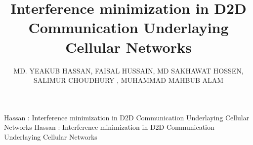 \documentclass{ieeeaccess}
\begin{document}

\title{Interference minimization in D2D Communication Underlaying Cellular Networks}
\author{\uppercase{Md. Yeakub Hassan},
	\uppercase{Faisal Hussain, Md Sakhawat Hossen, Salimur Choudhury , Muhammad Mahbub Alam}}
\address[1]{Department of Computer Science and Engineering, Islamic University of Technology, Dhaka, Bangladesh (e-mail: yeakubhassan@iut-dhaka.edu, faisalhussain@iut-dhaka.edu, sakhawat@iut-dhaka.edu, mma@iut-dhaka.edu)}
\address[2]{Department of Computer Science, Lakehead University, Thunder Bay, Ontario, Canada (e-mail: salimur.choudhury@lakeheadu.ca)}



%
%


\markboth
{Hassan \headeretal: Interference minimization in D2D Communication Underlaying Cellular Networks}
{Hassan \headeretal: Interference minimization in D2D Communication Underlaying Cellular Networks}

\end{document}
